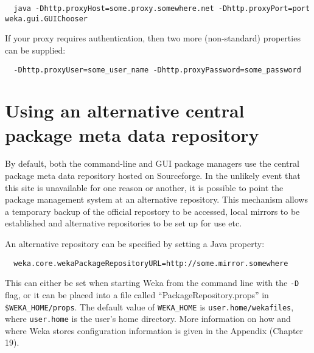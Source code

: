 {\scriptsize
\begin{verbatim}
  java -Dhttp.proxyHost=some.proxy.somewhere.net -Dhttp.proxyPort=port weka.gui.GUIChooser
\end{verbatim}}

If your proxy requires authentication, then two more (non-standard) properties can be
supplied:

{\scriptsize
\begin{verbatim}
  -Dhttp.proxyUser=some_user_name -Dhttp.proxyPassword=some_password
\end{verbatim}}

\section{Using an alternative central package meta data repository}

By default, both the command-line and GUI package managers use the
central package meta data repository hosted on Sourceforge. In the
unlikely event that this site is unavailable for one reason or
another, it is possible to point the package management system at an
alternative repository. This mechanism allows a temporary backup of
the official repostory to be accessed, local mirrors to be established
and alternative repositories to be set up for use etc.

An alternative repository can be specified by setting a Java property:

{\scriptsize
\begin{verbatim}
  weka.core.wekaPackageRepositoryURL=http://some.mirror.somewhere
\end{verbatim}}

This can either be set when starting Weka from the command line with
the \texttt{-D} flag, or it can be placed into a file called
``PackageRepository.props'' in \verb=$WEKA_HOME/props=. The default
value of \verb=WEKA_HOME= is \verb=user.home/wekafiles=, where
\verb=user.home= is the user's home directory. More information on how
and where Weka stores configuration information is given in the
Appendix (Chapter 19).
